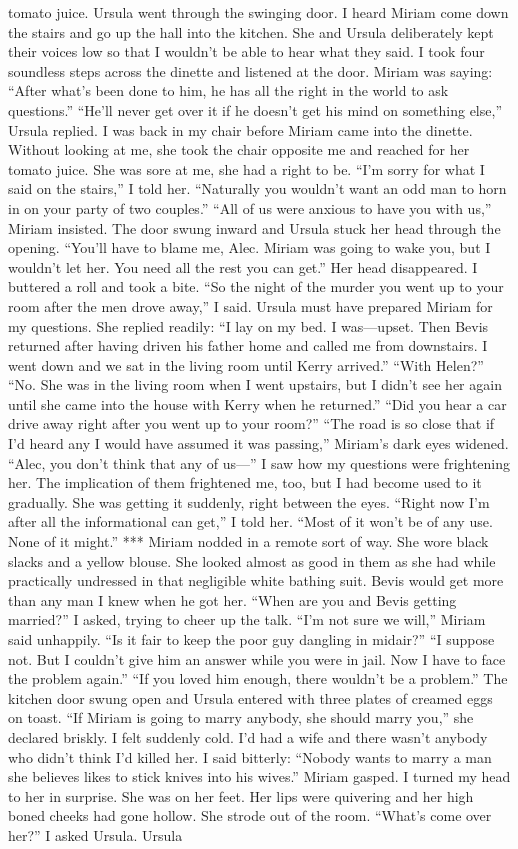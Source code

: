 \documentclass{novel}
\begin{document}
tomato juice. Ursula went through the swinging door. I heard Miriam come down the stairs and go up the hall into the kitchen. She and Ursula deliberately kept their voices low so that I wouldn’t be able to hear what they said. I took four soundless steps across the dinette and listened at the door. Miriam was saying: “After what’s been done to him, he has all the right in the world to ask questions.” “He’ll never get over it if he doesn’t get his mind on something else,” Ursula replied. I was back in my chair before Miriam came into the dinette. Without looking at me, she took the chair opposite me and reached for her tomato juice. She was sore at me, she had a right to be. “I’m sorry for what I said on the stairs,” I told her. “Naturally you wouldn’t want an odd man to horn in on your party of two couples.” “All of us were anxious to have you with us,” Miriam insisted. The door swung inward and Ursula stuck her head through the opening. “You’ll have to blame me, Alec. Miriam was going to wake you, but I wouldn’t let her. You need all the rest you can get.” Her head disappeared. I buttered a roll and took a bite. “So the night of the murder you went up to your room after the men drove away,” I said. Ursula must have prepared Miriam for my questions. She replied readily: “I lay on my bed. I was—upset. Then Bevis returned after having driven his father home and called me from downstairs. I went down and we sat in the living room until Kerry arrived.” “With Helen?” “No. She was in the living room when I went upstairs, but I didn’t see her again until she came into the house with Kerry when he returned.” “Did you hear a car drive away right after you went up to your room?” “The road is so close that if I’d heard any I would have assumed it was passing,” Miriam’s dark eyes widened. “Alec, you don’t think that any of us—” I saw how my questions were frightening her. The implication of them frightened me, too, but I had become used to it gradually. She was getting it suddenly, right between the eyes. “Right now I’m after all the informational can get,” I told her. “Most of it won’t be of any use. None of it might.” *** Miriam nodded in a remote sort of way. She wore black slacks and a yellow blouse. She looked almost as good in them as she had while practically undressed in that negligible white bathing suit. Bevis would get more than any man I knew when he got her. “When are you and Bevis getting married?” I asked, trying to cheer up the talk. “I’m not sure we will,” Miriam said unhappily. “Is it fair to keep the poor guy dangling in midair?” “I suppose not. But I couldn’t give him an answer while you were in jail. Now I have to face the problem again.” “If you loved him enough, there wouldn’t be a problem.” The kitchen door swung open and Ursula entered with three plates of creamed eggs on toast. “If Miriam is going to marry anybody, she should marry you,” she declared briskly. I felt suddenly cold. I’d had a wife and there wasn’t anybody who didn’t think I’d killed her. I said bitterly: “Nobody wants to marry a man she believes likes to stick knives into his wives.” Miriam gasped. I turned my head to her in surprise. She was on her feet. Her lips were quivering and her high boned cheeks had gone hollow. She strode out of the room. “What’s come over her?” I asked Ursula. Ursula 
\end{document}
